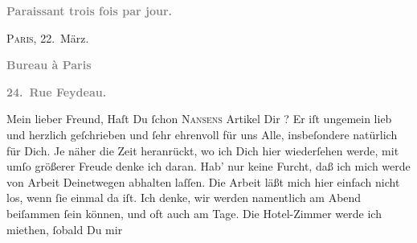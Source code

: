 \begin{ledgroupsized}[t]{13cm}
           \pstart
           \begin{otherlanguage}{french}\textcolor{gray}{\textbf{\textbf{Paraissant trois fois par jour.}}}\end{otherlanguage}\hfill \textsc{Paris}, 22. März.\pend
           \pstart
           \begin{otherlanguage}{french}\textcolor{gray}{\textbf{\textbf{Bureau à Paris}}}\end{otherlanguage}\pend
           \pstart
           \begin{otherlanguage}{french}\textcolor{gray}{\textbf{\textbf{24. Rue Feydeau.}}}\end{otherlanguage}\pend
           \pstart\center{}Mein lieber Freund,\pend\pstart
           Haſt Du ſchon \textsc{Nansens}{ }Artikel Dir \label{K_L02806-1v}\label{K_L02806-1h}? Er iſt ungemein lieb und herzlich geſchrieben und ſehr ehrenvoll für uns
               Alle, insbeſondere natürlich für Dich.\pend
           \pstart
           Je näher die Zeit heranrückt, wo ich Dich hier wiederſehen werde, mit umſo größerer
               Freude denke ich daran. Hab’ nur keine Furcht, daß ich mich werde von Arbeit
               Deinetwegen abhalten laſſen. Die Arbeit läßt mich hier einfach nicht los, wenn ſie
               einmal da iſt. Ich denke, wir werden namentlich am Abend beiſammen ſein können, und oft auch am Tage. {\pb} Die Hotel-Zimmer werde ich miethen, ſobald Du mir

\end{ledgroupsized}
